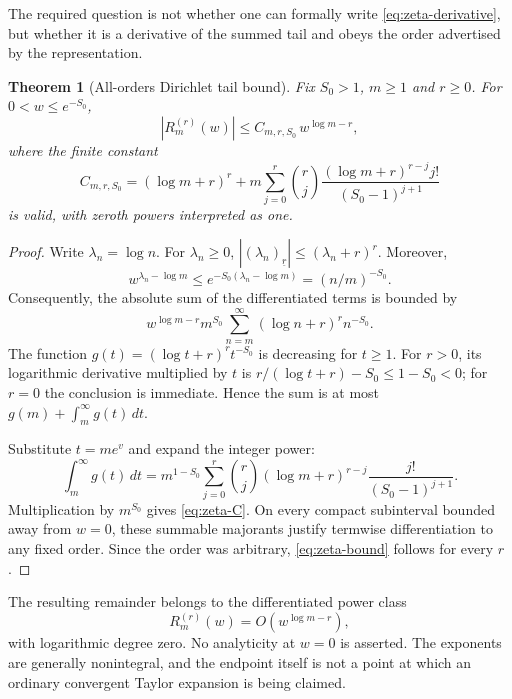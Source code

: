 \documentclass[11pt,a4paper]{article}
\newtheorem{theorem}{Theorem}[section]
\begin{document}
The required question is not whether one can formally write \eqref{eq:zeta-derivative}, but whether it is a derivative of the summed tail and obeys the order advertised by the representation.

\begin{theorem}[All-orders Dirichlet tail bound]\label{thm:zeta}
Fix $S_0>1$, $m\geq1$ and $r\geq0$. For $0<w\leq e^{-S_0}$,
\begin{equation}\label{eq:zeta-bound}
 |R_m^{(r)}(w)|\leq C_{m,r,S_0}\,w^{\log m-r},
\end{equation}
where the finite constant
\begin{equation}\label{eq:zeta-C}
 C_{m,r,S_0}=(\log m+r)^r+
 m\sum_{j=0}^{r}\binom rj
  \frac{(\log m+r)^{r-j}j!}{(S_0-1)^{j+1}}
\end{equation}
is valid, with zeroth powers interpreted as one.
\end{theorem}
\begin{proof}
Write $\lambda_n=\log n$. For $\lambda_n\geq0$,
$|(\lambda_n)_{\underline r}|\leq(\lambda_n+r)^r$. Moreover,
\[
 w^{\lambda_n-\log m}\leq
 e^{-S_0(\lambda_n-\log m)}=(n/m)^{-S_0}.
\]
Consequently, the absolute sum of the differentiated terms is bounded by
\[
 w^{\log m-r}m^{S_0}
   \sum_{n=m}^{\infty}(\log n+r)^r n^{-S_0}.
\]
The function $g(t)=(\log t+r)^r t^{-S_0}$ is decreasing for $t\geq1$. For $r>0$, its logarithmic derivative multiplied by $t$ is
$r/(\log t+r)-S_0\leq1-S_0<0$; for $r=0$ the conclusion is immediate. Hence the sum is at most $g(m)+\int_m^\infty g(t)\,dt$.

Substitute $t=m e^v$ and expand the integer power:
\[
 \int_m^{\infty}g(t)\,dt
 =m^{1-S_0}\sum_{j=0}^{r}\binom rj
    (\log m+r)^{r-j}\frac{j!}{(S_0-1)^{j+1}}.
\]
Multiplication by $m^{S_0}$ gives \eqref{eq:zeta-C}. On every compact subinterval bounded away from $w=0$, these summable majorants justify termwise differentiation to any fixed order. Since the order was arbitrary, \eqref{eq:zeta-bound} follows for every $r$.
\end{proof}

The resulting remainder belongs to the differentiated power class
\[
 R_m^{(r)}(w)=O(w^{\log m-r}),
\]
with logarithmic degree zero. No analyticity at $w=0$ is asserted. The exponents are generally nonintegral, and the endpoint itself is not a point at which an ordinary convergent Taylor expansion is being claimed.
\end{document}
